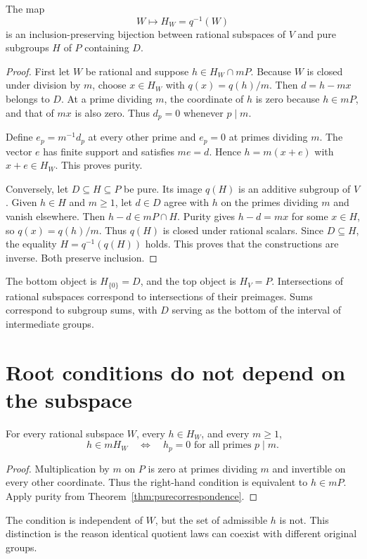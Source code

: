 \begin{theorem}
\label{thm:purecorrespondence}
The map
\[
W\longmapsto H_W=q^{-1}(W)
\]
is an inclusion-preserving bijection between rational subspaces of $V$ and pure subgroups $H$ of $P$ containing $D$.
\end{theorem}
\begin{proof}
First let $W$ be rational and suppose $h\in H_W\cap mP$. Because $W$ is closed under division by $m$, choose $x\in H_W$ with $q(x)=q(h)/m$. Then $d=h-mx$ belongs to $D$. At a prime dividing $m$, the coordinate of $h$ is zero because $h\in mP$, and that of $mx$ is also zero. Thus $d_p=0$ whenever $p\mid m$.

Define $e_p=m^{-1}d_p$ at every other prime and $e_p=0$ at primes dividing $m$. The vector $e$ has finite support and satisfies $me=d$. Hence $h=m(x+e)$ with $x+e\in H_W$. This proves purity.

Conversely, let $D\subseteq H\subseteq P$ be pure. Its image $q(H)$ is an additive subgroup of $V$. Given $h\in H$ and $m\ge1$, let $d\in D$ agree with $h$ on the primes dividing $m$ and vanish elsewhere. Then $h-d\in mP\cap H$. Purity gives $h-d=mx$ for some $x\in H$, so $q(x)=q(h)/m$. Thus $q(H)$ is closed under rational scalars. Since $D\subseteq H$, the equality $H=q^{-1}(q(H))$ holds. This proves that the constructions are inverse. Both preserve inclusion.
\end{proof}
The bottom object is $H_{\{0\}}=D$, and the top object is $H_V=P$. Intersections of rational subspaces correspond to intersections of their preimages. Sums correspond to subgroup sums, with $D$ serving as the bottom of the interval of intermediate groups.

\section{Root conditions do not depend on the subspace}
\begin{theorem}
\label{thm:ambientroot}
For every rational subspace $W$, every $h\in H_W$, and every $m\ge1$,
\[
h\in mH_W\quad\Longleftrightarrow\quad
h_p=0\text{ for all primes }p\mid m.
\]
\end{theorem}
\begin{proof}
Multiplication by $m$ on $P$ is zero at primes dividing $m$ and invertible on every other coordinate. Thus the right-hand condition is equivalent to $h\in mP$. Apply purity from Theorem~\ref{thm:purecorrespondence}.
\end{proof}
The condition is independent of $W$, but the set of admissible $h$ is not. This distinction is the reason identical quotient laws can coexist with different original groups.

